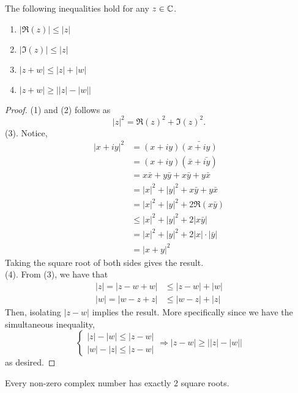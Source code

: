 \documentclass[11pt]{article}
\begin{document}
\begin{prop}
	The following inequalities hold for any $z \in \mathbb{C}$.
	\begin{enumerate}
		\item $|\Re(z)| \leq |z|$
		\item $|\Im(z)| \leq |z|$
		\item $|z+w| \leq |z|+|w|$
		\item $|z+w| \geq \bigg| |z|-|w|\bigg|$
	\end{enumerate}
	\begin{proof}
		(1) and (2) follows as
		\begin{equation*}
			|z|^2 = \Re(z)^2+\Im(z)^2.
		\end{equation*}
		(3). Notice,
		\begin{align*}
			|x+iy|^2 &= (x+iy)\bar{(x+iy)}\\
					   &= (x+iy)(\bar{x}+\bar{iy})\\
					   &= x\bar x+y \bar y+x \bar y+y \bar x\\
					   &= |x|^2+|y|^2+x \bar y+y \bar x\\
					   &= |x|^2+|y|^2+2\Re(x\bar y)\\
					   &\leq |x|^2+|y|^2+2|x\bar y|\\
					   &= |x|^2+|y|^2+2|x| \cdot |\bar y|\\
					   &= |x+y|^2
		\end{align*}
		Taking the square root of both sides gives the result.\\

		(4). From (3), we have that
		\begin{align*}
			|z| = |z-w+w| &\leq |z-w|+|w|\\
			|w| = |w-z+z| &\leq |w-z|+|z|
		\end{align*}
		Then, isolating $|z-w|$ implies the result. More specifically since we
		have the simultaneous inequality, \begin{equation*}
			\begin{cases}
				|z|-|w| \leq |z-w| \\
				|w|-|z| \leq |z-w|
			\end{cases}
			\Rightarrow
			|z-w| \geq \bigg| |z|-|w| \bigg|
		\end{equation*}
		as desired.
	\end{proof}
\end{prop}
\begin{prop}
	Every non-zero complex number has exactly 2 square roots.
\end{prop}
\end{document}
